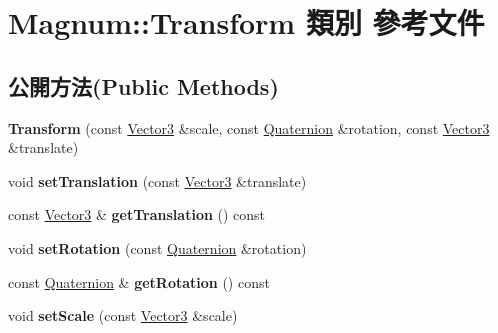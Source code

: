 \hypertarget{class_magnum_1_1_transform}{}\section{Magnum\+:\+:Transform 類別 參考文件}
\label{class_magnum_1_1_transform}
\subsection*{公開方法(Public Methods)}
\begin{DoxyCompactItemize}
\item 
{\bfseries Transform} (const \hyperlink{class_magnum_1_1_vector3}{Vector3} \&scale, const \hyperlink{class_magnum_1_1_quaternion}{Quaternion} \&rotation, const \hyperlink{class_magnum_1_1_vector3}{Vector3} \&translate)\hypertarget{class_magnum_1_1_transform_ab5ac0144f58ce273b4cd3004d2cc9030}{}\label{class_magnum_1_1_transform_ab5ac0144f58ce273b4cd3004d2cc9030}

\item 
void {\bfseries set\+Translation} (const \hyperlink{class_magnum_1_1_vector3}{Vector3} \&translate)\hypertarget{class_magnum_1_1_transform_a874d4f91300cd473876b758a2b69f3ff}{}\label{class_magnum_1_1_transform_a874d4f91300cd473876b758a2b69f3ff}

\item 
const \hyperlink{class_magnum_1_1_vector3}{Vector3} \& {\bfseries get\+Translation} () const \hypertarget{class_magnum_1_1_transform_af25c2824f4186172a3b47d83cad1793f}{}\label{class_magnum_1_1_transform_af25c2824f4186172a3b47d83cad1793f}

\item 
void {\bfseries set\+Rotation} (const \hyperlink{class_magnum_1_1_quaternion}{Quaternion} \&rotation)\hypertarget{class_magnum_1_1_transform_a82f09f9b0855677f410330127ed259ec}{}\label{class_magnum_1_1_transform_a82f09f9b0855677f410330127ed259ec}

\item 
const \hyperlink{class_magnum_1_1_quaternion}{Quaternion} \& {\bfseries get\+Rotation} () const \hypertarget{class_magnum_1_1_transform_a3006df2d7a642fcecd8dfa6560f87a4a}{}\label{class_magnum_1_1_transform_a3006df2d7a642fcecd8dfa6560f87a4a}

\item 
void {\bfseries set\+Scale} (const \hyperlink{class_magnum_1_1_vector3}{Vector3} \&scale)\hypertarget{class_magnum_1_1_transform_a4b7af4739e7f6aeca62b09f6fe4045c1}{}\label{class_magnum_1_1_transform_a4b7af4739e7f6aeca62b09f6fe4045c1}


\end{DoxyCompactItemize}
